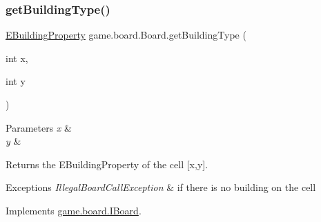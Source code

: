 \subsubsection{\texorpdfstring{get\+Building\+Type()}{getBuildingType()}\hspace{0.1cm}{\footnotesize\ttfamily [1/2]}}
{\footnotesize\ttfamily \mbox{\hyperlink{enumrule_engine_1_1entity_1_1_e_building_property}{E\+Building\+Property}} game.\+board.\+Board.\+get\+Building\+Type (\begin{DoxyParamCaption}\item[{int}]{x,  }\item[{int}]{y }\end{DoxyParamCaption})\hspace{0.3cm}{\ttfamily [inline]}}


\begin{DoxyParams}{Parameters}
{\em x} & \\
\hline
{\em y} & \\
\hline
\end{DoxyParams}
\begin{DoxyReturn}{Returns}
the E\+Building\+Property of the cell \mbox{[}x,y\mbox{]}. 
\end{DoxyReturn}

\begin{DoxyExceptions}{Exceptions}
{\em Illegal\+Board\+Call\+Exception} & if there is no building on the cell \\
\hline
\end{DoxyExceptions}


Implements \mbox{\hyperlink{interfacegame_1_1board_1_1_i_board_aeba201e4626a88c31e6f86894b1eab49}{game.\+board.\+I\+Board}}.

